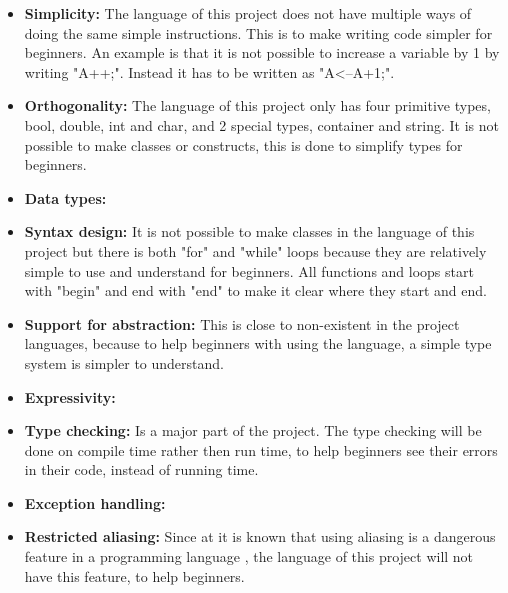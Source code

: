 \begin{itemize}
\item \textbf{Simplicity:} The language of this project does not have multiple ways of doing the same simple instructions. This is to make writing code simpler for beginners. An example is that it is not possible to increase a variable by 1 by writing "A++;". Instead it has to be written as "A<--A+1;".

\item \textbf{Orthogonality:} The language of this project only has four primitive types, bool, double, int and char, and 2 special types, container and string. It is not possible to make classes or constructs, this is done to simplify types for beginners.

\item \textbf{Data types:} 

\item \textbf{Syntax design:} It is not possible to make classes in the language of this project but there is both "for" and "while" loops because they are relatively simple to use and understand for beginners. All functions and loops start with "begin" and end with "end" to make it clear where they start and end.

\item \textbf{Support for abstraction:} This is close to non-existent in the project languages, because to help beginners with using the language, a simple  type system is simpler to understand.

\item \textbf{Expressivity:} 

\item \textbf{Type checking:} Is a major part of the project. The type checking will be done on compile time rather then run time, to help beginners see their errors in their code, instead of running time.

\item \textbf{Exception handling:} 

\item \textbf{Restricted aliasing:} Since at it is known that using aliasing is a dangerous feature in a programming language , the language of this project will not have this feature, to help beginners.
\end{itemize}
